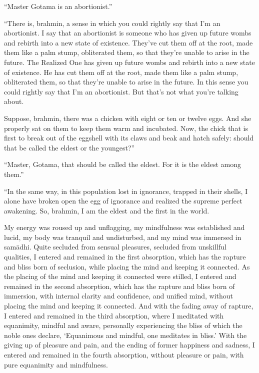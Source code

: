 \documentclass[12pt,openany]{book}%
\begin{document}
“Master Gotama is an abortionist.” 

“There is, brahmin, a sense in which you could rightly say that I’m an abortionist. I say that an abortionist is someone who has given up future wombs and rebirth into a new state of existence. They’ve cut them off at the root, made them like a palm stump, obliterated them, so that they’re unable to arise in the future. The Realized One has given up future wombs and rebirth into a new state of existence. He has cut them off at the root, made them like a palm stump, obliterated them, so that they’re unable to arise in the future. In this sense you could rightly say that I’m an abortionist. But that’s not what you’re talking about. 

Suppose, brahmin, there was a chicken with eight or ten or twelve eggs. And she properly sat on them to keep them warm and incubated. Now, the chick that is first to break out of the eggshell with its claws and beak and hatch safely: should that be called the eldest or the youngest?” 

“Master, Gotama, that should be called the eldest. For it is the eldest among them.” 

“In the same way, in this population lost in ignorance, trapped in their shells, I alone have broken open the egg of ignorance and realized the supreme perfect awakening. So, brahmin, I am the eldest and the first in the world. 

My energy was roused up and unflagging, my mindfulness was established and lucid, my body was tranquil and undisturbed, and my mind was immersed in \textsanskrit{samādhi}. Quite secluded from sensual pleasures, secluded from unskillful qualities, I entered and remained in the first absorption, which has the rapture and bliss born of seclusion, while placing the mind and keeping it connected. As the placing of the mind and keeping it connected were stilled, I entered and remained in the second absorption, which has the rapture and bliss born of immersion, with internal clarity and confidence, and unified mind, without placing the mind and keeping it connected. And with the fading away of rapture, I entered and remained in the third absorption, where I meditated with equanimity, mindful and aware, personally experiencing the bliss of which the noble ones declare, ‘Equanimous and mindful, one meditates in bliss.’ With the giving up of pleasure and pain, and the ending of former happiness and sadness, I entered and remained in the fourth absorption, without pleasure or pain, with pure equanimity and mindfulness. 
\end{document}
